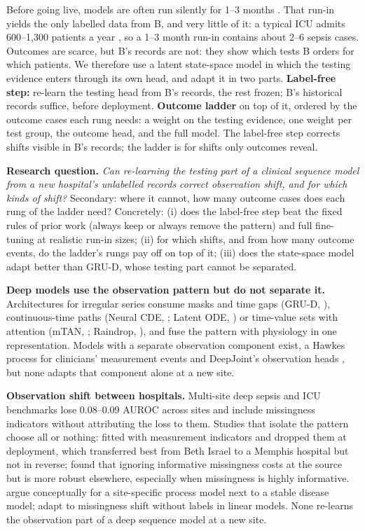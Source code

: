 \documentclass{article}
\theoremstyle{plain}
\theoremstyle{definition}
\theoremstyle{remark}
\begin{document}
Before going live, models are often run silently for 1--3 months \citep{sendak2020}. That run-in yields the only labelled data from B, and very little of it: a typical ICU admits 600--1{,}300 patients a year \citep{checkley2014}, so a 1--3 month run-in contains about 2--6 sepsis cases. Outcomes are scarce, but B's records are not: they show which tests B orders for which patients. We therefore use a latent state-space model in which the testing evidence enters through its own head, and adapt it in two parts. \textbf{Label-free step:} re-learn the testing head from B's records, the rest frozen; B's historical records suffice, before deployment. \textbf{Outcome ladder} on top of it, ordered by the outcome cases each rung needs: a weight on the testing evidence, one weight per test group, the outcome head, and the full model. The label-free step corrects shifts visible in B's records; the ladder is for shifts only outcomes reveal.

\textbf{Research question.} \emph{Can re-learning the testing part of a clinical sequence model from a new hospital's unlabelled records correct observation shift, and for which kinds of shift?} Secondary: where it cannot, how many outcome cases does each rung of the ladder need? Concretely: (i) does the label-free step beat the fixed rules of prior work (always keep or always remove the pattern) and full fine-tuning at realistic run-in sizes; (ii) for which shifts, and from how many outcome events, do the ladder's rungs pay off on top of it; (iii) does the state-space model adapt better than GRU-D, whose testing part cannot be separated.

\textbf{Deep models use the observation pattern but do not separate it.} Architectures for irregular series consume masks and time gaps (GRU-D, \citealp{che2018}), continuous-time paths (Neural CDE, \citealp{kidger2020}; Latent ODE, \citealp{rubanova2019}) or time-value sets with attention (mTAN, \citealp{shukla2021}; Raindrop, \citealp{zhang2022}), and fuse the pattern with physiology in one representation. Models with a separate observation component exist, a Hawkes process for clinicians' measurement events \citep{alaa2017} and DeepJoint's observation heads \citep{jeanselme2022}, but none adapts that component alone at a new site.

\textbf{Observation shift between hospitals.} Multi-site deep sepsis and ICU benchmarks lose 0.08--0.09 AUROC across sites \citep{moor2023,yaib2024} and include missingness indicators without attributing the loss to them. Studies that isolate the pattern choose all or nothing: \citet{futoma2021} fitted with measurement indicators and dropped them at deployment, which transferred best from Beth Israel to a Memphis hospital but not in reverse; \citet{rockenschaub2024} found that ignoring informative missingness costs at the source but is more robust elsewhere, especially when missingness is highly informative. \citet{lasko2024} argue conceptually for a site-specific process model next to a stable disease model; \citet{zhou2023} adapt to missingness shift without labels in linear models. None re-learns the observation part of a deep sequence model at a new site.
\end{document}
